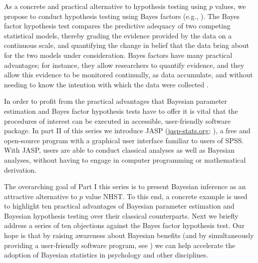 As a concrete and practical alternative to hypothesis testing using $p$ values, we propose to conduct hypothesis testing using Bayes factors (e.g., ). The Bayes factor hypothesis test compares the predictive adequacy of two competing statistical models, thereby grading the evidence provided by the data on a continuous scale, and quantifying the change in belief that the data bring about for the two models under consideration. Bayes factors have many practical advantages; for instance, they allow researchers to quantify evidence, and they allow this evidence to be monitored continually, as data accumulate, and without needing to know the intention with which the data were collected \cite{Rouder2014PBR,Wagenmakers2007}.

In order to profit from the practical advantages that Bayesian parameter estimation and Bayes factor hypothesis tests have to offer it is vital that the procedures of interest can be executed in accessible, user-friendly software package. In part II of this series \cite{WagenmakersEtAlsubmPBRPartII} we introduce JASP (\url{jasp-stats.org}; ), a free and open-source program with a graphical user interface familiar to users of SPSS. With JASP, users are able to conduct classical analyses as well as Bayesian analyses, without having to engage in computer programming or mathematical derivation.

The overarching goal of Part I this series is to present Bayesian inference as an attractive alternative to $p$ value NHST. To this end, a concrete example is used to highlight ten practical advantages of Bayesian parameter estimation and Bayesian hypothesis testing over their classical counterparts. Next we briefly address a series of ten objections against the Bayes factor hypothesis test. Our hope is that by raising awareness about Bayesian benefits (and by simultaneously providing a user-friendly software program, see ) we can help accelerate the adoption of Bayesian statistics in psychology and other disciplines.

